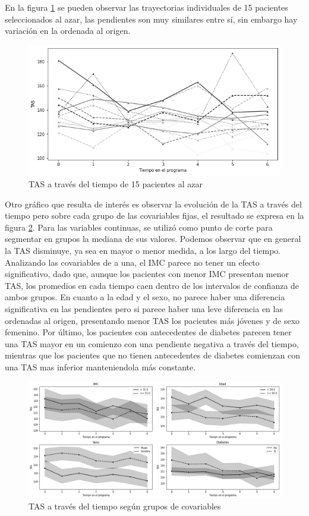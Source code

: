 \documentclass[spanish]{article}
\numberwithin{figure}{subsection}
\numberwithin{equation}{subsection}
\numberwithin{table}{subsection}
\begin{document}
En la figura \ref{spaghetti} se pueden observar las trayectorias individuales
de 15 pacientes seleccionados al azar, las pendientes son muy similares entre
sí, sin embargo hay variación en la ordenada al origen.

\begin{figure}[H]
	\centering
	\includegraphics[scale=0.5]{img/spaghetti_plot.png}
	\caption{TAS a través del tiempo de 15 pacientes al azar}
	\label{spaghetti}
\end{figure}

Otro gráfico que resulta de interés es observar la evolución de la TAS a través
del tiempo pero sobre cada grupo de las covariables fijas, el resultado se
expresa en la figura \ref{TAS_with_covs}. Para las variables continuas, se
utilizó como punto de corte para segmentar en grupos la mediana de sus valores.
Podemos observar que en general la TAS disminuye, ya sea en mayor o menor
medida, a los largo del tiempo. Analizando las covariables de a una, el IMC
parece no tener un efecto significativo, dado que, aunque los pacientes con
menor IMC presentan menor TAS, los promedios en cada tiempo caen dentro de los
intervalos de confianza de ambos grupos. En cuanto a la edad y el sexo, no
parece haber una diferencia significativa en las pendientes pero si parece haber
una leve diferencia en las ordenadas al origen, presentando menor TAS los
pacientes más jóvenes y de sexo femenino. Por último, los pacientes con
antecedentes de diabetes parecen tener una TAS mayor en un comienzo con una
pendiente negativa a través del tiempo, mientras que los pacientes que no tienen
antecedentes de diabetes comienzan con una TAS mas inferior manteniendola más
constante.

\begin{figure}[H]
	\centering
	\includegraphics[scale=0.4]{img/TAS_vs_tpo_with_covs.png}
	\caption{TAS a través del tiempo según grupos de covariables}
	\label{TAS_with_covs}
\end{figure}
\end{document}
